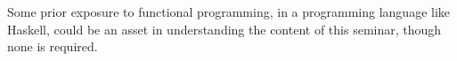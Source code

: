 Some prior exposure to functional programming, in a programming language like Haskell, could be an asset in understanding the content of this seminar, though none is required.
